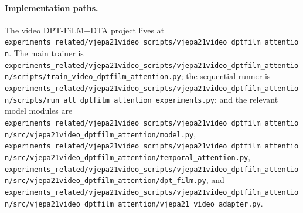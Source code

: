 \documentclass[10pt]{article}
\newcommand{\codepath}[1]{\begingroup\small\nolinkurl{#1}\endgroup}
\begin{document}
\paragraph{Implementation paths.}
The video DPT-FiLM+DTA project lives at \codepath{experiments_related/vjepa21video_scripts/vjepa21video_dptfilm_attention}.  The main trainer is \codepath{experiments_related/vjepa21video_scripts/vjepa21video_dptfilm_attention/scripts/train_video_dptfilm_attention.py}; the sequential runner is \codepath{experiments_related/vjepa21video_scripts/vjepa21video_dptfilm_attention/scripts/run_all_dptfilm_attention_experiments.py}; and the relevant model modules are \codepath{experiments_related/vjepa21video_scripts/vjepa21video_dptfilm_attention/src/vjepa21video_dptfilm_attention/model.py}, \codepath{experiments_related/vjepa21video_scripts/vjepa21video_dptfilm_attention/src/vjepa21video_dptfilm_attention/temporal_attention.py}, \codepath{experiments_related/vjepa21video_scripts/vjepa21video_dptfilm_attention/src/vjepa21video_dptfilm_attention/dpt_film.py}, and \codepath{experiments_related/vjepa21video_scripts/vjepa21video_dptfilm_attention/src/vjepa21video_dptfilm_attention/vjepa21_video_adapter.py}.

\begin{center}
\end{center}
\end{document}
